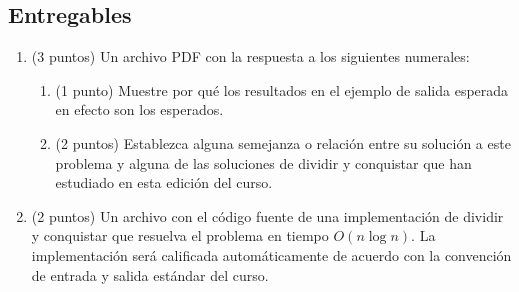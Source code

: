\subsection{Entregables}

\begin{enumerate}
  \item (3 puntos) Un archivo PDF con la respuesta a los siguientes numerales:
  \begin{enumerate}
      \item (1 punto) Muestre por qué los resultados en el ejemplo de salida esperada en efecto son los esperados.
      \item (2 puntos) Establezca alguna semejanza o relación entre su solución a este problema y alguna de las soluciones de dividir y conquistar que han estudiado en esta edición del curso.
  \end{enumerate}
  \item (2 puntos) Un archivo con el código fuente de una implementación de dividir y conquistar que resuelva el problema en tiempo $O(n \log n)$. La implementación será calificada automáticamente de acuerdo con la convención de entrada y salida estándar del curso.
\end{enumerate}
